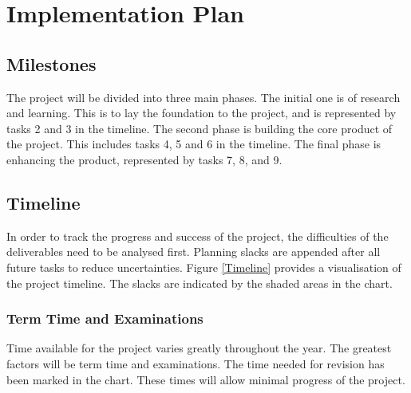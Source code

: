 \section{Implementation Plan}


\subsection{Milestones}
The project will be divided into three main phases.
The initial one is of research and learning.
This is to lay the foundation to the project, and is represented by tasks 2 and
3 in the timeline.
The second phase is building the core product of the project.
This includes tasks 4, 5 and 6 in the timeline.
The final phase is enhancing the product, represented by tasks 7, 8, and 9.

\subsection{Timeline}
\begin{figure*}[!b]
  \centering
  
  \caption{Project Timeline}
  \label{Timeline}
\end{figure*}

In order to track the progress and success of the project, the difficulties
of the deliverables need to be analysed first.
Planning slacks are appended after all future tasks to reduce uncertainties.
Figure \ref{Timeline} provides a visualisation of the project timeline.
The slacks are indicated by the shaded areas in the chart.

\subsubsection{\textbf{Term Time and Examinations}}
Time available for the project varies greatly throughout the year.
The greatest factors will be term time and examinations.
The time needed for revision has been marked in the chart.
These times will allow minimal progress of the project.


